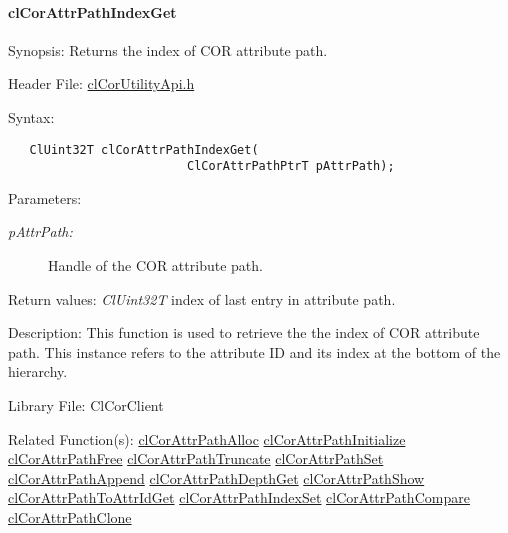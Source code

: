 \hypertarget{pagecor264}{}\paragraph{cl\-Cor\-Attr\-Path\-Index\-Get}\label{pagecor264}
\begin{Desc}
\item[Synopsis:]Returns the index of COR attribute path.\end{Desc}
\begin{Desc}
\item[Header File:]\hyperlink{cl_cor_utility_api_8h}{cl\-Cor\-Utility\-Api.h}\end{Desc}
\begin{Desc}
\item[Syntax:]

\footnotesize\begin{verbatim}   ClUint32T clCorAttrPathIndexGet(
                         ClCorAttrPathPtrT pAttrPath);
\end{verbatim}
\normalsize
\end{Desc}
\begin{Desc}
\item[Parameters:]
\begin{description}
\item[{\em p\-Attr\-Path:}]Handle of the COR attribute path.\end{description}
\end{Desc}
\begin{Desc}
\item[Return values:]{\em Cl\-Uint32T\/} index of last entry in attribute path.\end{Desc}
\begin{Desc}
\item[Description:]This function is used to retrieve the the index of COR attribute path. This instance refers to the attribute ID and its index at the bottom of the hierarchy.\end{Desc}
\begin{Desc}
\item[Library File:]Cl\-Cor\-Client\end{Desc}
\begin{Desc}
\item[Related Function(s):]\hyperlink{group__group13}{cl\-Cor\-Attr\-Path\-Alloc} \hyperlink{group__group13}{cl\-Cor\-Attr\-Path\-Initialize} \hyperlink{group__group13}{cl\-Cor\-Attr\-Path\-Free} \hyperlink{group__group13}{cl\-Cor\-Attr\-Path\-Truncate} \hyperlink{group__group13}{cl\-Cor\-Attr\-Path\-Set} \hyperlink{group__group13}{cl\-Cor\-Attr\-Path\-Append} \hyperlink{group__group13}{cl\-Cor\-Attr\-Path\-Depth\-Get} \hyperlink{group__group13}{cl\-Cor\-Attr\-Path\-Show} \hyperlink{group__group13}{cl\-Cor\-Attr\-Path\-To\-Attr\-Id\-Get} \hyperlink{group__group13}{cl\-Cor\-Attr\-Path\-Index\-Set} \hyperlink{group__group13}{cl\-Cor\-Attr\-Path\-Compare} \hyperlink{group__group13}{cl\-Cor\-Attr\-Path\-Clone} \end{Desc}
